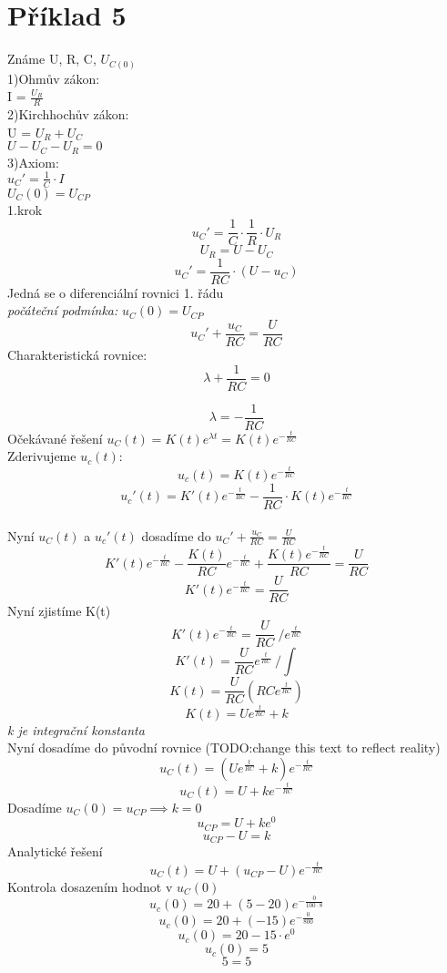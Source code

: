 \section{Příklad 5}
Známe U, R, C, $U_{C(0)}$\\
1)Ohmův zákon:\\ I = $\frac{U_{R}}{R}$\\
2)Kirchhochův zákon:\\ U = $U_{R}+U_{C}$\\ $U-U_{C}-U_{R}=0$\\
3)Axiom:\\$u_{C}'=\frac{1}{C} \cdot I$\\ $U_{C}(0)=U_{CP}$\\
1.krok\\
\[
  u_{C}'=\displaystyle\frac{1}{C} \cdot \displaystyle\frac{1}{R} \cdot U_{R}
\]
\[
  U_{R} = U-U_{C}
\]
\[
  u_{C}'=\displaystyle\frac{1}{RC} \cdot (U-u_{C})
\]
Jedná se o diferenciální rovnici 1. řádu\\
\textit{počáteční podmínka:} $u_{C}(0)=U_{CP}$\\
\[
  u_{C}'+\displaystyle\frac{u_{C}}{RC}= \displaystyle\frac{U}{RC}
\]
Charakteristická rovnice:
\[
  \lambda + \displaystyle\frac{1}{RC}=0
\]

\[
  \lambda =-\displaystyle\frac{1}{RC}
\]
Očekávané řešení $u_{C}(t)=K(t)e^{\lambda t} = K(t)e^{-\frac{t}{RC}}$\\
Zderivujeme $u_{c}(t)$:
\[
  u_{c}(t) = K(t)e^{-\frac{t}{RC}}
\]
\[
  u_{c}'(t)=K'(t)e^{-\frac{t}{RC}}- \displaystyle\frac{1}{RC} \cdot K(t)e^{-\frac{t}{RC}}
\]\\
Nyní $u_{C}(t)$ a $u_{c}'(t)$ dosadíme do $u_{C}'+\frac{u_{C}}{RC}=\frac{U}{RC}$
\[
  K'(t)e^{-\frac{t}{RC}}-\displaystyle\frac{K(t)}{RC}e^{-\frac{t}{RC}}+\displaystyle\frac{K(t)e^{-\frac{t}{RC}}}{RC}=\displaystyle\frac{U}{RC}
\]
\[
  K'(t)e^{-\frac{t}{RC}}=\displaystyle\frac{U}{RC}
\]
Nyní zjistíme K(t)
\[
  K'(t)e^{-\frac{t}{RC}}=\displaystyle\frac{U}{RC}\ /e^{\frac{t}{RC}}
\]
\[
  K'(t)=\displaystyle\frac{U}{RC}e^{\frac{t}{RC}}\ /\int{}{}
\]
\[
  K(t)=\displaystyle\frac{U}{RC}(RCe^{\frac{t}{RC}})
\]
\[
  K(t)=Ue^{\frac{t}{RC}}+k
\]
\textit{k je integrační konstanta}\\

Nyní dosadíme do původní rovnice (TODO:change this text to reflect reality)
\[
  u_{C}(t) = (Ue^{\frac{t}{RC}}+k)e^{-\frac{t}{RC}}
\]
\[
  u_{C}(t)=U+ke^{-\frac{t}{RC}}
\]
Dosadíme $u_{C}(0)=u_{CP}\implies k=0$
\[
  u_{CP}=U+ke^{0}
\]
\[
  u_{CP}-U=k
\]
Analytické řešení
\[
  u_{C}(t) = U + (u_{CP}-U)e^{-\frac{t}{RC}}
\]
Kontrola dosazením hodnot v $u_{C}(0)$
\[
  u_{c}(0) = 20 + (5-20)e^{-\frac{0}{100 \cdot 8}}
\]
\[
  u_{c}(0) = 20 + (-15)e^{-\frac{0}{800}}
\]
\[
  u_{c}(0) = 20 -15 \cdot e^{0}
\]
\[
  u_{c}(0) = 5 
\]
\[
  5=5
\]

